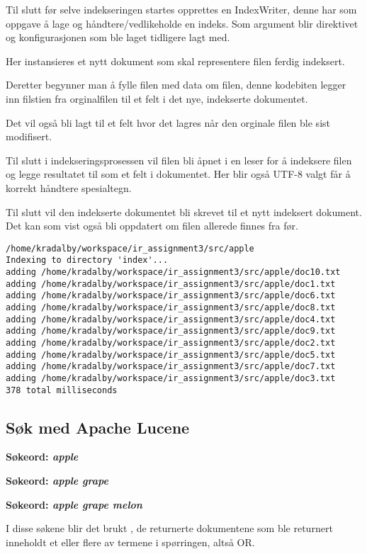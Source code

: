
Til slutt før selve indekseringen startes opprettes en IndexWriter, denne har som oppgave å lage og håndtere/vedlikeholde en indeks. Som argument blir direktivet og konfigurasjonen som ble laget tidligere lagt med.


Her instansieres et nytt dokument som skal representere filen ferdig indeksert.


Deretter begynner man å fylle filen med data om filen, denne kodebiten legger inn filstien fra orginalfilen til et felt i det nye, indekserte dokumentet. 


Det vil også bli lagt til et felt hvor det lagres når den orginale filen ble sist modifisert.


Til slutt i indekseringsprosessen vil filen bli åpnet i en leser for å indeksere filen og legge resultatet til som et felt i dokumentet. Her blir også UTF-8 valgt får å korrekt håndtere spesialtegn.

Til slutt vil den indekserte dokumentet bli skrevet til et nytt indeksert dokument. Det kan som vist også bli oppdatert om filen allerede finnes fra før.


\begin{lstlisting}[frame=single]  % Start your code-block
/home/kradalby/workspace/ir_assignment3/src/apple
Indexing to directory 'index'...
adding /home/kradalby/workspace/ir_assignment3/src/apple/doc10.txt
adding /home/kradalby/workspace/ir_assignment3/src/apple/doc1.txt
adding /home/kradalby/workspace/ir_assignment3/src/apple/doc6.txt
adding /home/kradalby/workspace/ir_assignment3/src/apple/doc8.txt
adding /home/kradalby/workspace/ir_assignment3/src/apple/doc4.txt
adding /home/kradalby/workspace/ir_assignment3/src/apple/doc9.txt
adding /home/kradalby/workspace/ir_assignment3/src/apple/doc2.txt
adding /home/kradalby/workspace/ir_assignment3/src/apple/doc5.txt
adding /home/kradalby/workspace/ir_assignment3/src/apple/doc7.txt
adding /home/kradalby/workspace/ir_assignment3/src/apple/doc3.txt
378 total milliseconds
\end{lstlisting}
\pagebreak
\subsection*{Søk med Apache Lucene}
\noindent \textbf{Søkeord: \textit{apple}}

\noindent \textbf{Søkeord: \textit{apple grape}}

\noindent \textbf{Søkeord: \textit{apple grape melon}}


I disse søkene blir det brukt , de returnerte dokumentene som ble returnert inneholdt et eller flere av termene i spørringen, altså OR.
